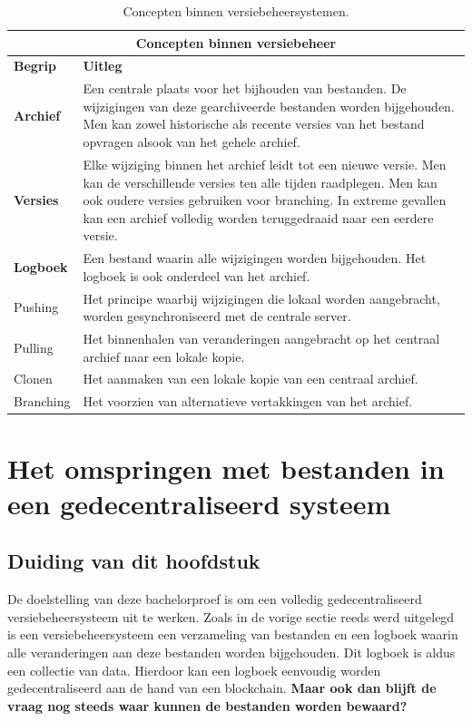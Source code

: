 \begin{table}[h!]
	\centering
	\begin{tabular}{ |p{2cm}|p{12cm}|}
 		\hline
 		\multicolumn{2}{|c|}{\large \textbf{Concepten binnen versiebeheer}} \\
 		\hline
 		\textbf{Begrip}	& \textbf{Uitleg}\\
 		\hline
 		\textbf{Archief} & Een centrale plaats voor het bijhouden van bestanden. De wijzigingen van deze gearchiveerde bestanden worden bijgehouden. Men kan zowel historische als recente versies van het bestand opvragen alsook van het gehele archief.\\
 		\hline
 		\textbf{Versies} & Elke wijziging binnen het archief leidt tot een nieuwe versie. Men kan de verschillende versies ten alle tijden raadplegen. Men kan ook oudere versies gebruiken voor branching. In extreme gevallen kan een archief volledig worden teruggedraaid naar een eerdere versie.\\
 		\hline
		\textbf{Logboek} & Een bestand waarin alle wijzigingen worden bijgehouden. Het logboek is ook onderdeel van het archief. \\
		\hline
		Pushing	& Het principe waarbij wijzigingen die lokaal worden aangebracht, worden gesynchroniseerd met de centrale server.\\
		\hline
		Pulling & Het binnenhalen van veranderingen aangebracht op het centraal archief naar een lokale kopie.\\
		\hline
		Clonen & Het aanmaken van een lokale kopie van een centraal archief. \\
		Branching & Het voorzien van alternatieve vertakkingen van het archief. \\
		\hline
	\end{tabular}
	\label{tbl_concepts}
	\caption{Concepten binnen versiebeheersystemen.}
\end{table}
\newpage
\section{Het omspringen met bestanden in een gedecentraliseerd systeem}
\label{IPFS}
\subsection{Duiding van dit hoofdstuk}
De doelstelling van deze bachelorproef is om een volledig gedecentraliseerd versiebeheersysteem uit te werken. Zoals in de vorige sectie reeds werd uitgelegd is een versiebeheersysteem een verzameling van bestanden en een logboek waarin alle veranderingen aan deze bestanden worden bijgehouden. Dit logboek is aldus een collectie van data. Hierdoor kan een logboek eenvoudig worden gedecentraliseerd aan de hand van een blockchain. \textbf{Maar ook dan blijft de vraag nog steeds waar kunnen de bestanden worden bewaard?}\\

